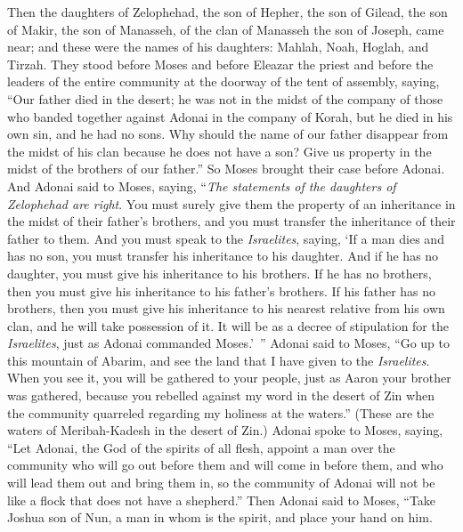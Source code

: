 \begin{biblechapter} %
 Then the daughters of Zelophehad, the son of Hepher, the son of Gilead, the son of Makir, the son of Manasseh, of the clan of Manasseh the son of Joseph, came near; and these were the names of his daughters: Mahlah, Noah, Hoglah, and Tirzah.
\verse They stood before Moses and before Eleazar the priest and before the leaders of the entire community at the doorway of the tent of assembly, saying,
\verse “Our father died in the desert; he was not in the midst of the company of those who banded together against Adonai in the company of Korah, but he died in his own sin, and he had no sons.
\verse Why should the name of our father disappear from the midst of his clan because he does not have a son? Give us property in the midst of the brothers of our father.”
\verse So Moses brought their case before Adonai.
\verse And Adonai said to Moses, saying,
\verse “\textit{The statements of the daughters of Zelophehad are right}. You must surely give them the property of an inheritance in the midst of their father’s brothers, and you must transfer the inheritance of their father to them.
\verse And you must speak to the \textit{Israelites}, saying, ‘If a man dies and has no son, you must transfer his inheritance to his daughter.
\verse And if he has no daughter, you must give his inheritance to his brothers.
\verse If he has no brothers, then you must give his inheritance to his father’s brothers.
\verse If his father has no brothers, then you must give his inheritance to his nearest relative from his own clan, and he will take possession of it. It will be as a decree of stipulation for the \textit{Israelites}, just as Adonai commanded Moses.’ ”
\verse Adonai said to Moses, “Go up to this mountain of Abarim, and see the land that I have given to the \textit{Israelites}.
\verse When you see it, you will be gathered to your people, just as Aaron your brother was gathered,
\verse because you rebelled against my word in the desert of Zin when the community quarreled regarding my holiness at the waters.” (These are the waters of Meribah-Kadesh in the desert of Zin.)
 Adonai spoke to Moses, saying,
\verse “Let Adonai, the God of the spirits of all flesh, appoint a man over the community
\verse who will go out before them and will come in before them, and who will lead them out and bring them in, so the community of Adonai will not be like a flock that does not have a shepherd.”
\verse Then Adonai said to Moses, “Take Joshua son of Nun, a man in whom is the spirit, and place your hand on him.

\end{biblechapter}
